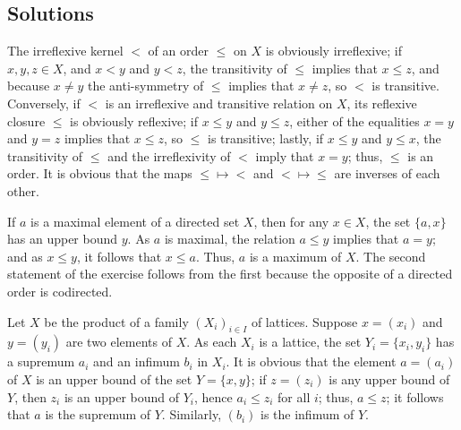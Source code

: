 \documentclass{article}
\begin{document}
\subsection{Solutions}
\label{sec:fzhm4l61}

\begin{solution}[\ref{exe:eydusvz3}]
  \label{sol:bxkmo56h}
  The irreflexive kernel \(<\) of an order \(\leq\) on \(X\) is
  obviously irreflexive; if \(x,y,z \in X\), and \(x < y\) and
  \(y < z\), the transitivity of \(\leq\) implies that \(x \leq z\),
  and because \(x \neq y\) the anti-symmetry of \(\leq\) implies that
  \(x \neq z\), so \(<\) is transitive.  Conversely, if \(<\) is an
  irreflexive and transitive relation on \(X\), its reflexive closure
  \(\leq\) is obviously reflexive; if \(x \leq y\) and \(y \leq z\),
  either of the equalities \(x = y\) and \(y = z\) implies that
  \(x \leq z\), so \(\leq\) is transitive; lastly, if \(x \leq y\) and
  \(y \leq x\), the transitivity of \(\leq\) and the irreflexivity of
  \(<\) imply that \(x = y\); thus, \(\leq\) is an order.  It is
  obvious that the maps \(\leq \mapsto <\) and \(< \mapsto \leq\) are
  inverses of each other.
\end{solution}

\begin{solution}[\ref{exe:swjbrepg}]
  \label{sol:pcqde5hb}
  If \(a\) is a maximal element of a directed set \(X\), then for any
  \(x \in X\), the set \(\{ a, x \}\) has an upper bound \(y\).  As
  \(a\) is maximal, the relation \(a \leq y\) implies that \(a = y\);
  and as \(x \leq y\), it follows that \(x \leq a\).  Thus, \(a\) is a
  maximum of \(X\).  The second statement of the exercise follows from
  the first because the opposite of a directed order is codirected.
\end{solution}

\begin{solution}[\ref{exe:yowl3axc}]
  \label{sol:rfwhck5v}
  Let \(X\) be the product of a family \((X_i)_{i \in I}\) of
  lattices.  Suppose \(x = (x_i)\) and \(y = (y_i)\) are two elements
  of \(X\).  As each \(X_i\) is a lattice, the set
  \(Y_i = \{ x_i, y_i \}\) has a supremum \(a_i\) and an infimum
  \(b_i\) in \(X_i\).  It is obvious that the element \(a = (a_i)\) of
  \(X\) is an upper bound of the set \(Y = \{ x, y \}\); if
  \(z = (z_i)\) is any upper bound of \(Y\), then \(z_i\) is an upper
  bound of \(Y_i\), hence \(a_i \leq z_i\) for all \(i\); thus,
  \(a \leq z\); it follows that \(a\) is the supremum of \(Y\).
  Similarly, \((b_i)\) is the infimum of \(Y\).
\end{solution}
\end{document}
